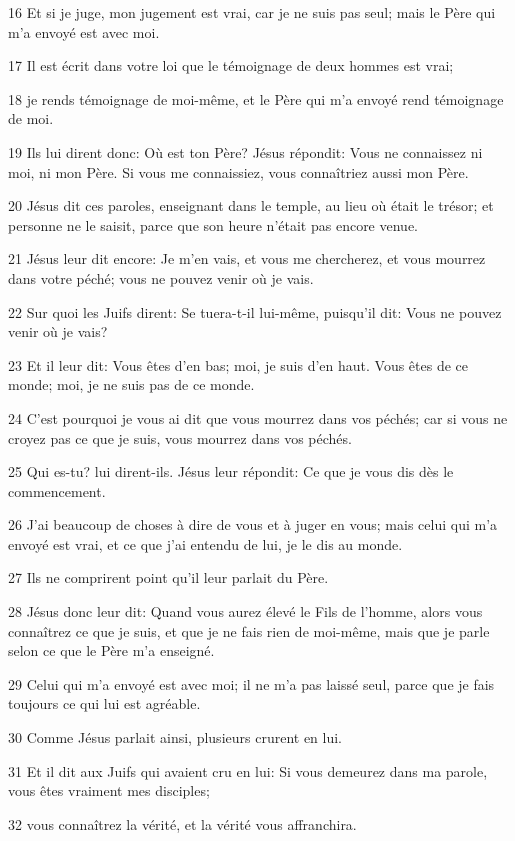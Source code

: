 \par 16 Et si je juge, mon jugement est vrai, car je ne suis pas seul; mais le Père qui m'a envoyé est avec moi.
\par 17 Il est écrit dans votre loi que le témoignage de deux hommes est vrai;
\par 18 je rends témoignage de moi-même, et le Père qui m'a envoyé rend témoignage de moi.
\par 19 Ils lui dirent donc: Où est ton Père? Jésus répondit: Vous ne connaissez ni moi, ni mon Père. Si vous me connaissiez, vous connaîtriez aussi mon Père.
\par 20 Jésus dit ces paroles, enseignant dans le temple, au lieu où était le trésor; et personne ne le saisit, parce que son heure n'était pas encore venue.
\par 21 Jésus leur dit encore: Je m'en vais, et vous me chercherez, et vous mourrez dans votre péché; vous ne pouvez venir où je vais.
\par 22 Sur quoi les Juifs dirent: Se tuera-t-il lui-même, puisqu'il dit: Vous ne pouvez venir où je vais?
\par 23 Et il leur dit: Vous êtes d'en bas; moi, je suis d'en haut. Vous êtes de ce monde; moi, je ne suis pas de ce monde.
\par 24 C'est pourquoi je vous ai dit que vous mourrez dans vos péchés; car si vous ne croyez pas ce que je suis, vous mourrez dans vos péchés.
\par 25 Qui es-tu? lui dirent-ils. Jésus leur répondit: Ce que je vous dis dès le commencement.
\par 26 J'ai beaucoup de choses à dire de vous et à juger en vous; mais celui qui m'a envoyé est vrai, et ce que j'ai entendu de lui, je le dis au monde.
\par 27 Ils ne comprirent point qu'il leur parlait du Père.
\par 28 Jésus donc leur dit: Quand vous aurez élevé le Fils de l'homme, alors vous connaîtrez ce que je suis, et que je ne fais rien de moi-même, mais que je parle selon ce que le Père m'a enseigné.
\par 29 Celui qui m'a envoyé est avec moi; il ne m'a pas laissé seul, parce que je fais toujours ce qui lui est agréable.
\par 30 Comme Jésus parlait ainsi, plusieurs crurent en lui.
\par 31 Et il dit aux Juifs qui avaient cru en lui: Si vous demeurez dans ma parole, vous êtes vraiment mes disciples;
\par 32 vous connaîtrez la vérité, et la vérité vous affranchira.
